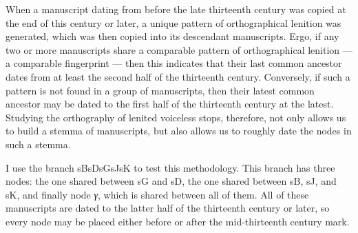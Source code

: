 When a manuscript dating from before the late thirteenth century was copied at the end of this century or later, a unique pattern of orthographical lenition  was generated, which was then copied into its descendant manuscripts.
Ergo, if any two or more manuscripts share a comparable pattern of orthographical lenition --- a comparable fingerprint --- then this indicates that their last common ancestor dates from at least the second half of the thirteenth century. Conversely, if such a pattern is not found in a group of manuscripts, then their latest common ancestor may be dated to the first half of the thirteenth century at the latest. Studying the orthography of lenited voiceless stops, therefore, not only allows us to build a stemma of manuscripts, but also allows us to roughly date the nodes in such a stemma.


I use the branch \gls{sB}\gls{sD}\gls{sG}\gls{sJ}\gls{sK}
to  test this methodology. This branch has three nodes: the one shared between \gls{sG} and \gls{sD}, the one shared between \gls{sB}, \gls{sJ}, and \gls{sK}, and finally node \textit{γ}, which is shared between all of them. All of these manuscripts are dated to the latter half of the thirteenth century or later, so every node may be placed either before or after the mid-thirteenth century mark.

